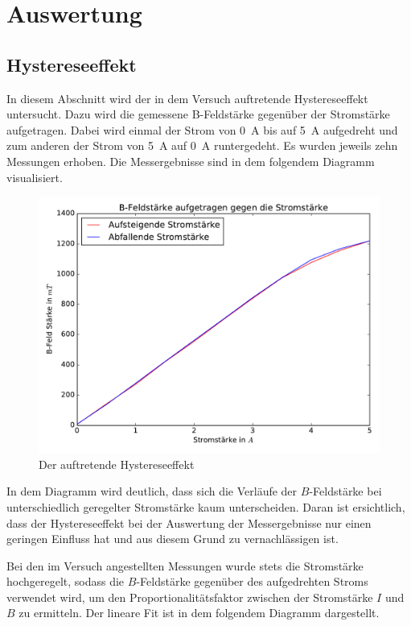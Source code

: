 



\section{Auswertung}

\subsection{Hystereseeffekt}

In diesem Abschnitt wird der in dem Versuch auftretende Hystereseeffekt untersucht.
Dazu wird die gemessene B-Feldstärke gegenüber der Stromstärke aufgetragen. Dabei
wird einmal der Strom von \SI{0}{\ampere} bis auf \SI{5}{\ampere} aufgedreht und zum
anderen der Strom von \SI{5}{\ampere} auf \SI{0}{\ampere} runtergedeht.
Es wurden jeweils zehn Messungen erhoben. Die Messergebnisse sind in dem folgendem
Diagramm visualisiert.

\begin{figure}
  \includegraphics[width=\textwidth]{Hysterese.pdf}
  \caption{Der auftretende Hystereseeffekt}
  \label{fig:Hysterese}
\end{figure}

In dem Diagramm wird deutlich, dass sich die Verläufe der $B$-Feldstärke bei
unterschiedlich geregelter Stromstärke kaum unterscheiden. Daran ist ersichtlich,
dass der Hystereseeffekt bei der Auswertung der Messergebnisse nur einen geringen
Einfluss hat und aus diesem Grund zu vernachlässigen ist.

Bei den im Versuch angestellten Messungen wurde stets die Stromstärke hochgeregelt,
sodass die $B$-Feldstärke gegenüber des aufgedrehten Stroms verwendet wird, um
den Proportionalitätsfaktor zwischen der Stromstärke $I$ und $B$ zu ermitteln.
Der lineare Fit ist in dem folgendem Diagramm dargestellt.

